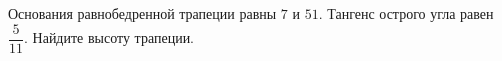 \begin{ex}
	\begin{condition}
		Основания равнобедренной трапеции равны \( 7  \) и \( 51 \). Тангенс острого угла равен \( \dfrac{5}{11} \).  Найдите высоту трапеции.
	\end{condition}
\end{ex}